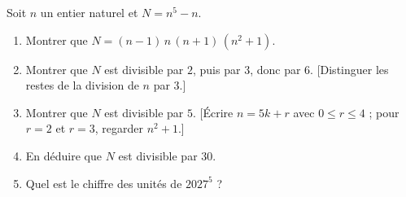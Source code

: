 
Soit $n$ un entier naturel et $N=n^5-n$.
\begin{enumerate}
  \item Montrer que $N=(n-1)\,n\,(n+1)\,(n^2+1)$.
  \item Montrer que $N$ est divisible par $2$, puis par $3$, donc par $6$. [Distinguer les restes de la division de $n$ par $3$.]
  \item Montrer que $N$ est divisible par $5$. [Écrire $n=5k+r$ avec $0\leq r\leq4$ ; pour $r=2$ et $r=3$, regarder $n^2+1$.]
  \item En déduire que $N$ est divisible par $30$.
  \item Quel est le chiffre des unités de $2027^5$ ?
\end{enumerate}

